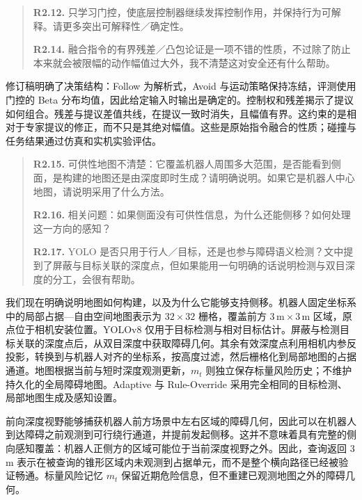\begin{quote}
\textbf{R2.12.} 只学习门控，使底层控制器继续发挥控制作用，并保持行为可解释。请更多突出可解释性／确定性。

\textbf{R2.14.} 融合指令的有界残差／凸包论证是一项不错的性质，不过除了防止本来就会被限幅的动作幅值过大外，我不清楚这对安全还有什么帮助。
\end{quote}
\response
修订稿明确了决策结构：Follow 为解析式，Avoid 与运动策略保持冻结，评测使用门控的 Beta 分布均值，因此给定输入时输出是确定的。控制权和残差揭示了提议如何组合。残差与提议差值共线，在提议一致时消失，且幅值有界。这约束的是相对于专家提议的修正，而不只是其绝对幅值。这些是原始指令融合的性质；碰撞与任务结果通过仿真和实机实验评估。

\begin{quote}
\textbf{R2.15.} 可供性地图不清楚：它覆盖机器人周围多大范围，是否能看到侧面，是构建的地图还是由深度即时生成？请明确说明。如果它是机器人中心地图，请说明采用了什么方法。

\textbf{R2.16.} 相关问题：如果侧面没有可供性信息，为什么还能侧移？如何处理这一方向的感知？

\textbf{R2.17.} YOLO 是否只用于行人／目标，还是也参与障碍语义检测？文中提到了屏蔽与目标关联的深度点，但如果能用一句明确的话说明检测与双目深度的分工，会很有帮助。
\end{quote}
\response
我们现在明确说明地图如何构建，以及为什么它能够支持侧移。机器人固定坐标系中的局部占据—自由空间地图表示为 $32\times32$ 栅格，覆盖前方 $3\,\mathrm{m}\times3\,\mathrm{m}$ 区域，原点位于相机安装位置。YOLOv8 仅用于目标检测与相对目标估计。屏蔽与检测目标关联的深度点后，从双目深度中获取障碍几何。其余有效深度点利用相机内参反投影，转换到与机器人对齐的坐标系，按高度过滤，然后栅格化到局部地图的占据通道。地图根据当前与短时深度观测更新，$m_t$ 则独立保存标量风险历史；不维护持久化的全局障碍地图。Adaptive 与 Rule-Override 采用完全相同的目标检测、局部地图生成及感知设置。

前向深度视野能够捕获机器人前方场景中左右区域的障碍几何，因此可以在机器人到达障碍之前观测到可行绕行通道，并提前发起侧移。这并不意味着具有完整的侧向感知覆盖：机器人正侧方的区域可能位于当前深度视野之外。因此，查询返回 3 m 表示在被查询的锥形区域内未观测到占据单元，而不是整个横向路径已经被验证畅通。标量风险记忆 $m_t$ 保留近期危险信息，但不重建已观测地图之外的障碍几何。


